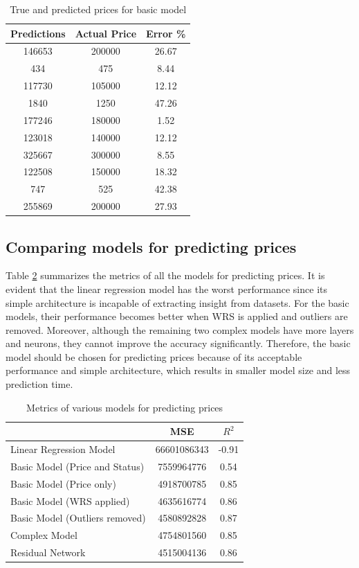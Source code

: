 \documentclass[12pt,twoside]{report}
\begin{document}
\begin{table}[!htbp]
	\centering
	\caption{ True and predicted prices for basic model}
	\label{resnet_prediction_price}
	\begin{tabular}{| c | c | c |}
		\hline
		Predictions & Actual Price & Error \% \\
		\hline
		146653 & 200000 & 26.67 \\
		\hline
		434 & 475 & 8.44 \\
		\hline
		117730 & 105000 & 12.12 \\
		\hline
		1840 & 1250 & 47.26 \\
		\hline
		177246 & 180000 & 1.52 \\
		\hline
		123018 & 140000 & 12.12 \\
		\hline
		325667 & 300000 & 8.55 \\ 
		\hline
		122508 & 150000 & 18.32 \\
		\hline
		747 & 525 & 42.38 \\
		\hline
		255869 & 200000 & 27.93 \\
		\hline
	\end{tabular}
\end{table}

\subsection{Comparing models for predicting prices}
Table \ref{metrics_basic_model} summarizes the metrics of all the models for predicting prices. It is evident that the linear regression model has the worst performance since its simple architecture is incapable of extracting insight from datasets. For the basic models, their performance becomes better when WRS is applied and outliers are removed. Moreover, although the remaining two complex models have more layers and neurons, they cannot improve the accuracy significantly. Therefore, the basic model should be chosen for predicting prices because of its acceptable performance and simple architecture, which results in smaller model size and less prediction time. 
\begin{table}[!htbp]
	\centering
	\caption{Metrics of various models for predicting prices}
	\label{metrics_basic_model}
	\begin{tabular}{| l | c | c |}
		\hline
		& MSE & $R^2$ \\
		\hline
		Linear Regression Model & 66601086343 & -0.91 \\
		\hline
		Basic Model (Price and Status) & 7559964776 & 0.54 \\
		\hline
		Basic Model (Price only) & 4918700785 & 0.85 \\
		\hline
		Basic Model (WRS applied) & 4635616774 & 0.86 \\
		\hline
		Basic Model (Outliers removed) & 4580892828 & 0.87 \\
		\hline
		Complex Model & 4754801560 & 0.85 \\
		\hline
		Residual Network & 4515004136 & 0.86 \\
		\hline
	\end{tabular}
\end{table}
\end{document}
